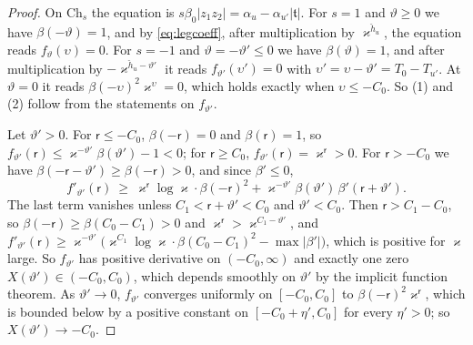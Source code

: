 \begin{proof}
On $\mathrm{Ch}_s$ the equation is $s\beta_0|z_1z_2|=\alpha_u-\alpha_{u'}|\mathfrak t|$. For $s=1$
and $\vartheta\ge0$ we have $\beta(-\vartheta)=1$, and by \eqref{eq:legcoeff}, after multiplication by $\varkappa^{\check h_u}$, the
equation reads $f_\vartheta(\upsilon)=0$. For $s=-1$ and $\vartheta=-\vartheta'\le0$ we have $\beta(\vartheta)=1$, and after
multiplication by $-\varkappa^{\check h_u-\vartheta'}$ it reads $f_{\vartheta'}(\upsilon')=0$ with $\upsilon'=\upsilon-\vartheta'=T_0-T_{u'}$. At
$\vartheta=0$ it reads $\beta(-\upsilon)^2\varkappa^{\upsilon}=0$, which holds exactly when $\upsilon\le-C_0$. So (1) and (2) follow from the
statements on $f_{\vartheta'}$.

Let $\vartheta'>0$. For $\mathsf r\le-C_0$, $\beta(-\mathsf r)=0$ and $\beta(\mathsf r)=1$, so $f_{\vartheta'}(\mathsf r)\le
\varkappa^{-\vartheta'}\beta(\vartheta')-1<0$; for $\mathsf r\ge C_0$, $f_{\vartheta'}(\mathsf r)=\varkappa^{\mathsf r}>0$. For $\mathsf r>-C_0$ we have
$\beta(-\mathsf r-\vartheta')\ge\beta(-\mathsf r)>0$, and since $\beta'\le0$,
\[
f'_{\vartheta'}(\mathsf r)\ \ge\ \varkappa^{\mathsf r}\log \varkappa\cdot\beta(-\mathsf r)^2+\varkappa^{-\vartheta'}\beta(\vartheta')\,\beta'(\mathsf r+\vartheta').
\]
The last term vanishes unless $C_1<\mathsf r+\vartheta'<C_0$ and $\vartheta'<C_0$. Then $\mathsf r>C_1-C_0$, so
$\beta(-\mathsf r)\ge\beta(C_0-C_1)>0$ and $\varkappa^{\mathsf r}>\varkappa^{C_1-\vartheta'}$, and
$f'_{\vartheta'}(\mathsf r)\ge \varkappa^{-\vartheta'}\bigl(\varkappa^{C_1}\log \varkappa\cdot\beta(C_0-C_1)^2-\max|\beta'|\bigr)$, which is positive for $\varkappa$
large. So $f_{\vartheta'}$ has positive derivative on $(-C_0,\infty)$ and exactly one zero $X(\vartheta')\in(-C_0,C_0)$, which
depends smoothly on $\vartheta'$ by the implicit function theorem. As $\vartheta'\to0$, $f_{\vartheta'}$ converges uniformly on
$[-C_0,C_0]$ to $\beta(-\mathsf r)^2\varkappa^{\mathsf r}$, which is bounded below by a positive constant on $[-C_0+\eta',C_0]$ for every $\eta'>0$;
so $X(\vartheta')\to-C_0$.
\end{proof}

